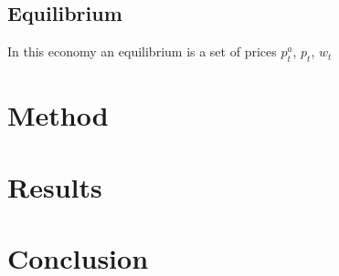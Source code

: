 \documentclass{article}
\begin{document}
\subsection{Equilibrium}

In this economy an equilibrium is a set of prices {$p^a_t$, $p_t$, $w_t$}

\section{Method} \label{method}

\section{Results} \label{results}

\section{Conclusion} \label{conclusion}


\newpage
\printbibliography
\end{document}
